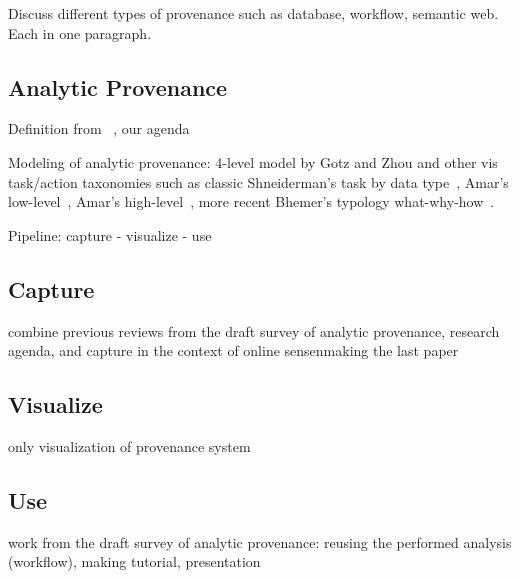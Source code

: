 Discuss different types of provenance such as database, workflow, semantic web. Each in one paragraph.

\subsection{Analytic Provenance}
Definition from ~\cite{North2011}, our agenda~\cite{Xu2015}

Modeling of analytic provenance: 4-level model by Gotz and Zhou and other vis task/action taxonomies such as classic Shneiderman's task by data type~\cite{Shneiderman1996}, Amar's low-level~\cite{Amar2005}, Amar's high-level~\cite{Amar2004}, more recent Bhemer's typology what-why-how~\cite{Brehmer2013}.

Pipeline: capture - visualize - use

\subsection{Capture}
combine previous reviews from the draft survey of analytic provenance, research agenda, and capture in the context of online sensenmaking the last paper

\subsection{Visualize}
only visualization of provenance system

\subsection{Use}
work from the draft survey of analytic provenance: reusing the performed analysis (workflow), making tutorial, presentation


